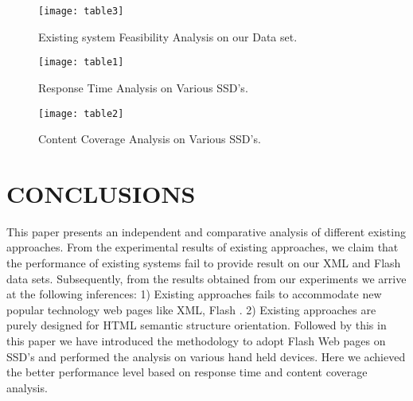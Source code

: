 \documentclass[fleqn,twoside]{article}
\begin{document}
\begin{figure*}[ht!]
\centering
\begin{center}
\texttt{[image: table3]}
\caption{Existing system Feasibility Analysis on our Data set.}
\end{center}
\end{figure*}




\begin{figure*}[ht!]
\centering
\begin{center}
\texttt{[image: table1]}
\caption{Response Time Analysis on Various SSD’s.}
\end{center}
\end{figure*}

\begin{figure*}[ht!]
\centering
\begin{center}
\texttt{[image: table2]}
\caption{Content Coverage Analysis on Various SSD’s.}
\end{center}
\end{figure*}


\section{CONCLUSIONS}
This paper presents an independent and comparative analysis of different existing approaches. From the experimental results of existing approaches, we claim that the performance of existing systems fail to provide result on our XML and Flash data sets. Subsequently, from the results obtained from our experiments we arrive at the following inferences: 1) Existing approaches fails to accommodate new popular technology web pages like XML, Flash . 2) Existing approaches are purely designed for  HTML semantic structure orientation. Followed by this in this paper we have introduced the methodology to adopt Flash Web pages on SSD's and performed the analysis on various hand held devices. Here we achieved the better performance level based on response time and content coverage analysis. 

\small
\balance
\end{document}
